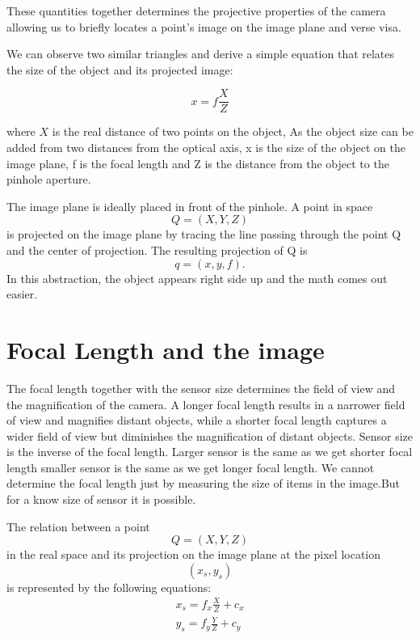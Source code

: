\documentclass{article}
\begin{document}
These quantities together determines the projective properties of the camera allowing us to briefly locates a point's image on the image plane and verse visa.

We can observe two similar triangles and derive a simple equation that relates the size of the object and its projected image:

\begin{equation}
    x = f \frac{X}{Z}
\end{equation}

where $X$ is the real distance of two points on the object, As the object size can be added from two distances from the optical axis,  x is the size of the object on the image plane,  f is the focal length and Z is the distance from the object to the pinhole aperture.

The image plane is ideally placed in front of the pinhole. A point in space
\begin{equation}
    Q = (X, Y, Z)
\end{equation}
is projected on the image plane by tracing the line passing through the point Q and the center of projection. The resulting projection of Q is
\begin{equation}
    q = (x,y,f).
\end{equation}
In this abstraction, the object appears right side up and the math comes out easier.

\section{Focal Length and the image}

The focal length together with the sensor size determines the field of view and the magnification of the camera. A longer focal length results in a narrower field of view and magnifies distant objects, while a shorter focal length captures a wider field of view but diminishes the magnification of distant objects. Sensor size is the inverse of the focal length. Larger sensor is the same as we get shorter focal length smaller sensor is the same as we get longer focal length. We cannot determine the focal length just by measuring the size of items in the image.But for a know size of sensor it is possible.

The relation between a point \begin{equation}
    Q=(X, Y, Z)
\end{equation}in the real space and its projection on the image plane at the pixel location \begin{equation}
    (x_s, y_s)
\end{equation} is represented by the following equations:
\begin{eqnarray}
    x_s=f_x\frac{X}{Z}+c_x \\
    y_s=f_y\frac{Y}{Z}+c_y
\end{eqnarray}
\end{document}
